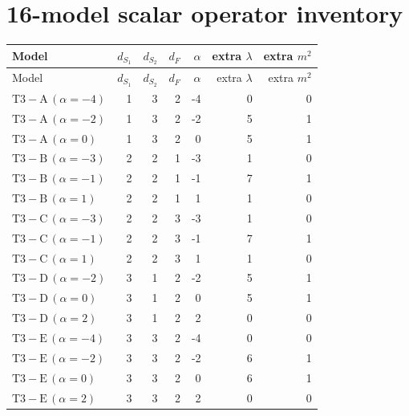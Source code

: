 \documentclass[9pt,a4paper]{article}
\begin{document}
\section*{16-model scalar operator inventory}
\begin{longtable}{@{}lrrrrrr@{}}
\toprule
Model & $d_{S_1}$ & $d_{S_2}$ & $d_F$ & $\alpha$ & extra $\lambda$ & extra $m^2$\\
\midrule
\endfirsthead
\toprule
Model & $d_{S_1}$ & $d_{S_2}$ & $d_F$ & $\alpha$ & extra $\lambda$ & extra $m^2$\\
\midrule
\endhead
$\mathrm{T3-A}\,(\alpha=-4)$ & 1 & 3 & 2 & -4 & 0 & 0 \\
$\mathrm{T3-A}\,(\alpha=-2)$ & 1 & 3 & 2 & -2 & 5 & 1 \\
$\mathrm{T3-A}\,(\alpha=0)$ & 1 & 3 & 2 & 0 & 5 & 1 \\
$\mathrm{T3-B}\,(\alpha=-3)$ & 2 & 2 & 1 & -3 & 1 & 0 \\
$\mathrm{T3-B}\,(\alpha=-1)$ & 2 & 2 & 1 & -1 & 7 & 1 \\
$\mathrm{T3-B}\,(\alpha=1)$ & 2 & 2 & 1 & 1 & 1 & 0 \\
$\mathrm{T3-C}\,(\alpha=-3)$ & 2 & 2 & 3 & -3 & 1 & 0 \\
$\mathrm{T3-C}\,(\alpha=-1)$ & 2 & 2 & 3 & -1 & 7 & 1 \\
$\mathrm{T3-C}\,(\alpha=1)$ & 2 & 2 & 3 & 1 & 1 & 0 \\
$\mathrm{T3-D}\,(\alpha=-2)$ & 3 & 1 & 2 & -2 & 5 & 1 \\
$\mathrm{T3-D}\,(\alpha=0)$ & 3 & 1 & 2 & 0 & 5 & 1 \\
$\mathrm{T3-D}\,(\alpha=2)$ & 3 & 1 & 2 & 2 & 0 & 0 \\
$\mathrm{T3-E}\,(\alpha=-4)$ & 3 & 3 & 2 & -4 & 0 & 0 \\
$\mathrm{T3-E}\,(\alpha=-2)$ & 3 & 3 & 2 & -2 & 6 & 1 \\
$\mathrm{T3-E}\,(\alpha=0)$ & 3 & 3 & 2 & 0 & 6 & 1 \\
$\mathrm{T3-E}\,(\alpha=2)$ & 3 & 3 & 2 & 2 & 0 & 0 \\
\bottomrule
\end{longtable}
\end{document}

